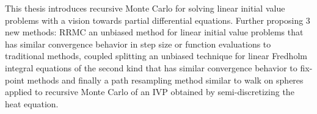 This thesis introduces recursive Monte Carlo
for solving linear initial value problems with a vision towards
partial differential equations.
Further proposing $3$ new methods:
RRMC an unbiased method for linear initial value problems
that has similar convergence behavior in step size or function evaluations to traditional methods,
coupled splitting an unbiased technique for linear Fredholm integral equations of the
second kind that has similar convergence behavior to fix-point methods
and finally a path resampling method similar to walk on spheres applied
to recursive Monte Carlo of an IVP obtained by semi-discretizing the heat equation.